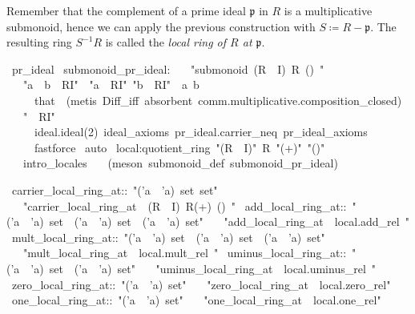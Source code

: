 \documentclass[12pt]{scrartcl}
\begin{document}
Remember that the complement of a prime ideal $\mathfrak{p}$ in $R$ is a multiplicative submonoid, hence we can apply the previous construction with $S \coloneqq R - \mathfrak{p}$. The resulting ring  $S^{-1} R$ is called the \emph{local ring of $R$ at $\mathfrak{p}$}. \\

\begin{isabelle}
\ pr\_ideal\isanewline
{}\isanewline
\isanewline
{}\ submonoid\_pr\_ideal:\isanewline
\ \ \ "submonoid\ (R\ \isasymsetminus \ I)\ R\ (\isasymcdot )\ \isasymone "\isanewline
{}\isanewline
\ \ \ "a\ \isasymcdot \ b\ \isasymin \ R\isasymsetminus I"\ \ "a\ \isasymin \ R\isasymsetminus I"\ "b\ \isasymin \ R\isasymsetminus I"\ \ a\ b\isanewline
\ \ \ \ \ that\ \ (metis\ Diff\_iff\ absorbent\ comm.multiplicative.composition\_closed)\isanewline
\ \ \ "\isasymone \ \isasymin \ R\isasymsetminus I"\isanewline
\ \ \ \ \ ideal.ideal(2)\ ideal\_axioms\ pr\_ideal.carrier\_neq\ pr\_ideal\_axioms\ \isanewline
\ \ \ \ \ fastforce\isanewline
{}\ auto%
\isanewline
\isanewline
{}\ local:quotient\_ring\ "(R\ \isasymsetminus \ I)"\ R\ "(+)"\ "(\isasymcdot )"\ \isasymzero \ \isasymone \isanewline
\ \ \ intro\_locales\isanewline
\ \ \ (meson\ submonoid\_def\ submonoid\_pr\_ideal)

\isanewline
{}\ carrier\_local\_ring\_at::\ "('a\ \isasymtimes \ 'a)\ set\ set"\isanewline
\ \ \ "carrier\_local\_ring\_at\ \isasymequiv \ (R\ \isasymsetminus \ I)\isactrlsup \isasyminverse \ R\isactrlbsub (+)\ (\isasymcdot )\ \isasymzero \isactrlesub "\isanewline
\isanewline
{}\ add\_local\_ring\_at::\ "('a\ \isasymtimes \ 'a)\ set\ \isasymRightarrow \ ('a\ \isasymtimes \ 'a)\ set\ \isasymRightarrow \ ('a\ \isasymtimes \ 'a)\ set"\isanewline
\ \ \ "add\_local\_ring\_at\ \isasymequiv \ local.add\_rel\ "\isanewline
\isanewline
{}\ mult\_local\_ring\_at::\ "('a\ \isasymtimes \ 'a)\ set\ \isasymRightarrow \ ('a\ \isasymtimes \ 'a)\ set\ \isasymRightarrow \ ('a\ \isasymtimes \ 'a)\ set"\isanewline
\ \ \ "mult\_local\_ring\_at\ \isasymequiv \ local.mult\_rel\ "\isanewline
\isanewline
{}\ uminus\_local\_ring\_at::\ "('a\ \isasymtimes \ 'a)\ set\ \isasymRightarrow \ ('a\ \isasymtimes \ 'a)\ set"\isanewline
\ \ \ "uminus\_local\_ring\_at\ \isasymequiv \ local.uminus\_rel\ "\isanewline
\isanewline
{}\ zero\_local\_ring\_at::\ "('a\ \isasymtimes \ 'a)\ set"\isanewline
\ \ \ "zero\_local\_ring\_at\ \isasymequiv \ local.zero\_rel"\isanewline
\isanewline
{}\ one\_local\_ring\_at::\ "('a\ \isasymtimes \ 'a)\ set"\isanewline
\ \ \ "one\_local\_ring\_at\ \isasymequiv \ local.one\_rel"\isanewline
\isanewline
{}
\end{isabelle}
\end{document}
